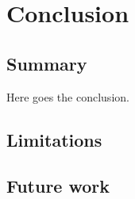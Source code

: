 \chapter{Conclusion}
\pagestyle{fancy}
\pagestyle{fancy}\chead{} \pagestyle{fancy}\rhead{}
\pagestyle{fancy}
\pagestyle{fancy}\cfoot{} \pagestyle{fancy}\rfoot{\thepage}
\section{Summary}
Here goes the conclusion.\\
\section{Limitations}
\section{Future work}






